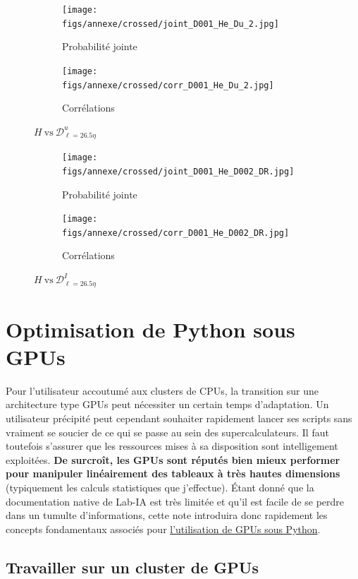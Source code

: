 \documentclass[13pt, a4paper]{extarticle}
\begin{document}
\begin{figure}[H]
  \centering
  \begin{subfigure}[b]{0.48\linewidth}
  \centering
  \texttt{[image: figs/annexe/crossed/joint\_D001\_He\_Du\_2.jpg]}
  \caption{Probabilité jointe}
  \end{subfigure}
  \begin{subfigure}[b]{0.48\linewidth}
    \centering
    \texttt{[image: figs/annexe/crossed/corr\_D001\_He\_Du\_2.jpg]}
    \caption{Corrélations}
    \end{subfigure}
    \caption{$H~\text{vs}~\mathscr{D}^u_{\ell=26.5\eta}$}
\end{figure}

\begin{figure}[H]
  \centering
  \begin{subfigure}[b]{0.48\linewidth}
  \centering
  \texttt{[image: figs/annexe/crossed/joint\_D001\_He\_D002\_DR.jpg]}
  \caption{Probabilité jointe}
  \end{subfigure}
  \begin{subfigure}[b]{0.48\linewidth}
    \centering
    \texttt{[image: figs/annexe/crossed/corr\_D001\_He\_D002\_DR.jpg]}
    \caption{Corrélations}
    \end{subfigure}
    \caption{$H~\text{vs}~\mathscr{D}^I_{\ell=26.5\eta}$}
\end{figure}

\section{Optimisation de Python sous GPUs}\label{sec:gpus}
\noindent Pour l'utilisateur accoutumé aux clusters de CPUs, la transition sur une architecture
type GPUs peut nécessiter un certain temps d'adaptation. Un utilisateur précipité peut
cependant souhaiter rapidement lancer ses scripts sans vraiment se soucier de ce qui
se passe au sein des supercalculateurs. Il faut toutefois s'assurer que les ressources mises
à sa disposition sont intelligement exploitées. {\bf De surcroît, les GPUs sont réputés
bien mieux performer pour manipuler linéairement des tableaux à très hautes dimensions}
(typiquement les calculs statistiques que j'effectue). Étant donné que la documentation
native de Lab-IA est très limitée et qu'il est facile de se perdre dans un
tumulte d'informations, cette note introduira donc
rapidement les concepts fondamentaux associés pour \ul{l'utilisation de GPUs sous Python}.

\subsection{Travailler sur un cluster de GPUs}
\end{document}
